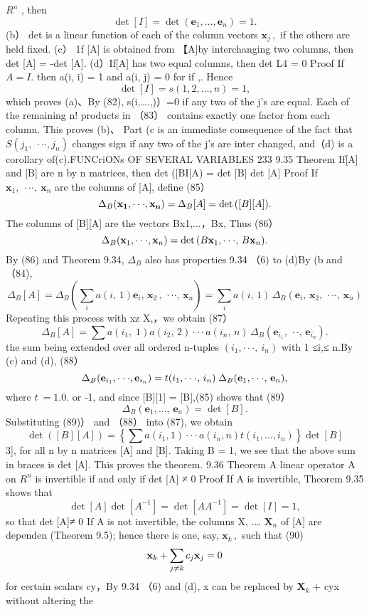 $\textstyle R^{n}$ , then $$ \operatorname*{det}\left[I\right]=\operatorname*{det}\left(\mathbf{e}_{1},\dots,\mathbf{e}_{n}\right)=1. $$ (b） det is a linear function of each of the column vectors $\mathbf{x}_{j}\,,$ if the others are held fixed. (c） 1f [A] is obtained from 【A]by interchanging two columns, then det [A] = -det [A]. (d）If[A] has two equal columns, then det L4 = 0 Proof If $A=I.$ then a(i, i) = 1 and a(i, j) = 0 for if ,. Hence $$ \operatorname*{det}\left[I\right]=s(1,2,\dots,n)=1, $$ which proves (a)、By (82), s(i,….,)）=0 if any two of the j's are equal. Each of the remaining n! products in （83） contains exactly one factor from each column. This proves (b)、 Part (c is an immediate consequence of the fact that $S(j_{1},\ \cdot\cdot\cdot,j_{n})$ changes sign if any two of the j's are inter changed, and（d) is a corollary of(c).FUNCriONs OF SEVERAL VARIABLES 233 9.35 Theorem If[A] and [B] are n by n matrices, then det ([BI[A) = det [B] det [A] Proof If $\mathbf{x}_{1},\ \cdot\cdot\cdot,\ \mathbf{x}_{n}$ are the columns of [A], define (85） $$ \Delta_{B}({\bf x_{1}},\cdot\cdot\cdot,{\bf x_{n}})=\Delta_{B}[A]=\operatorname*{det}{([B][A])}. $$ The columns of [B][A] are the vectors Bx1,...，Bx, Thus (86） $$ \Delta_{B}({\bf x}_{1},\cdot\cdot\cdot,{\bf x}_{n})=\operatorname*{det}{(B{\bf x}_{1},\cdot\cdot\cdot,\,B{\bf x}_{n})}. $$ By (86) and Theorem 9.34, $\Delta_{B}$ also has properties 9.34 （6) to (d)By (b and （84), $$ \Delta_{B}[A]=\Delta_{B}\left(\sum_{i}a(i,\,1)\mathbf{e}_{i},\,\mathbf{x}_{2}\,,\,\cdot\cdot\cdot,\,\mathbf{x}_{n}\right)=\sum_{i}a(i,\,1)\,\Delta_{B}(\mathbf{e}_{i},\,\mathbf{x}_{2},\,\cdot\cdot\cdot,\,\mathbf{x}_{n}) $$ Repeating this process with xz X,，we obtain (87） $$ \Delta_{B}[A]=\sum a(i_{1},\;1)a(i_{2},\,2)\cdot\cdot\cdot a(i_{n},\,n)\,\Delta_{B}(\mathbf{e}_{i_{1}},\,\cdot\cdot,\,\mathbf{e}_{i_{n}}). $$ the sum being extended over all ordered n-tuples $(i_{1},\cdot\cdot\cdot,\ i_{n})$ with 1 ≤i,≤ n.By (c) and (d), (88） $$ \Delta_{B}({\bf e}_{i_{1}},\cdot\cdot\cdot,{\bf e}_{i_{n}})=t(i_{1},\cdot\cdot\cdot,\,i_{n})\;\Delta_{B}({\bf e}_{1},\cdot\cdot\cdot,\,{\bf e}_{n}), $$ where $\scriptstyle t\ =1.0.$ or -1, and since [B][1] = [B],(85) shows that (89） $$ \Delta_{B}({\mathbf{e}}_{1},\dots,\,{\mathbf{e}}_{n})=\operatorname*{det}\left[B\right]. $$ Substituting (89)） and （88） into (87), we obtain $$ \operatorname*{det}\left([B][A]\right)=\left\{\sum a(i_{1},1)\cdot\cdot\cdot a(i_{n},n)t(i_{1},\ldots,i_{n})\right\}\operatorname*{det}\left[B\right] $$ 3], for all n by n matrices [A] and [B]. Taking B = 1, we see that the above sum in braces is det [A]. This proves the theorem. 9.36 Theorem A linear operator A on $R^{n}$ is invertible if and only if det [A] ≠ 0 Proof If A is invertible, Theorem 9.35 shows that $$ \operatorname*{det}\left[A\right]\operatorname*{det}\left[A^{-1}\right]=\operatorname*{det}\left[A A^{-1}\right]=\operatorname*{det}\left[I\right]=1, $$ so that det [A]≠ 0 If A is not invertible, the columns X, .… $\mathbf{X}_{n}$ of [A] are dependen (Theorem 9.5); hence there is one, say, $\mathbf{x}_{k}\,,$ such that (90) $$ {\bf x}_{k}+\sum_{j\neq k}c_{j}{\bf x}_{j}=0 $$ for certain scalars cy，By 9.34 （6) and (d), x can be replaced by $\mathbf{X}_{k}$ + cyx without altering the 